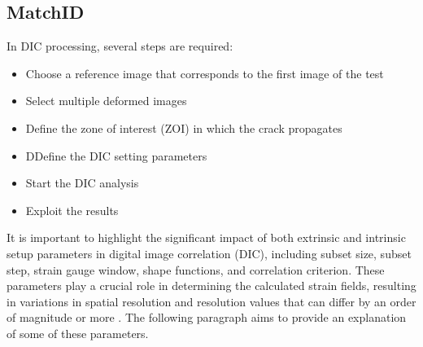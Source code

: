 \subsection{MatchID}

In DIC processing, several steps are required:

\begin{itemize}
	\item Choose a reference image that corresponds to the first image of the test 
	\item Select multiple deformed images
	\item Define the zone of interest (ZOI) in which the crack propagates
	\item DDefine the  DIC setting parameters
	\item Start the DIC analysis
	\item Exploit the results
\end{itemize}

It is important to highlight the significant impact of both extrinsic and intrinsic setup parameters in digital image correlation (DIC), including subset size, subset step, strain gauge window, shape functions, and correlation criterion. These parameters play a crucial role in determining the calculated strain fields, resulting in variations in spatial resolution and resolution values that can differ by an order of magnitude or more \citep{DICguide2018}. The following paragraph aims to provide an explanation of some of these parameters.

